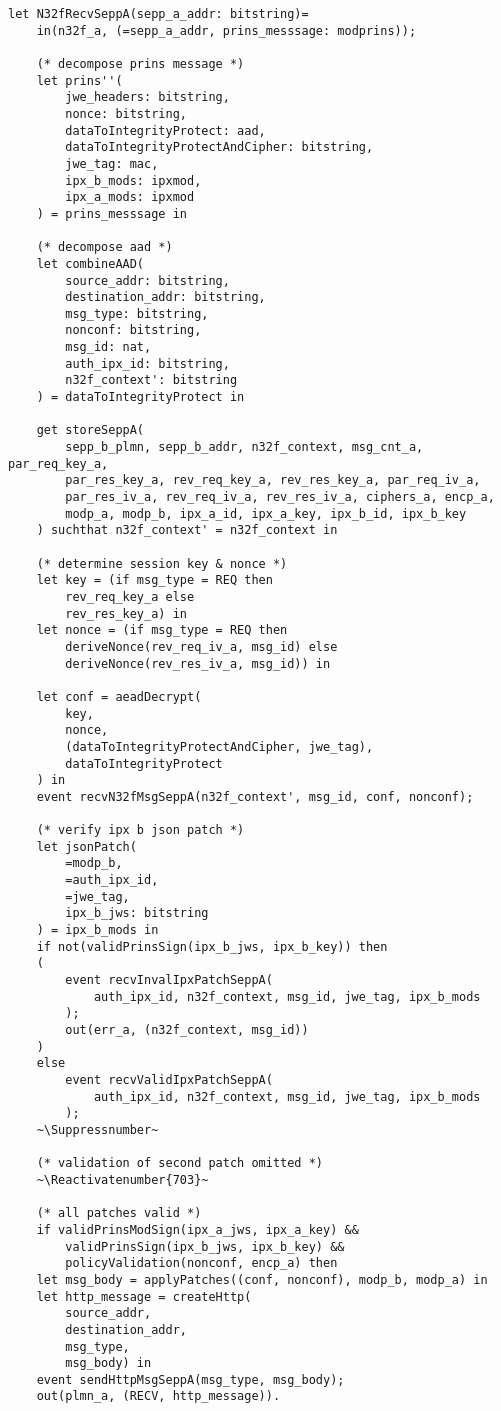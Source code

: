 \lstset{escapeinside=~~}
\begin{lstlisting}[caption={Definition of the receiving N32-f signaling transmission process},label={lst:n32f-recv},firstnumber=623]
let N32fRecvSeppA(sepp_a_addr: bitstring)=
    in(n32f_a, (=sepp_a_addr, prins_messsage: modprins));

    (* decompose prins message *)
    let prins''(
        jwe_headers: bitstring,
        nonce: bitstring,
        dataToIntegrityProtect: aad,
        dataToIntegrityProtectAndCipher: bitstring,
        jwe_tag: mac,
        ipx_b_mods: ipxmod,
        ipx_a_mods: ipxmod
    ) = prins_messsage in

    (* decompose aad *)
    let combineAAD(
        source_addr: bitstring,
        destination_addr: bitstring,
        msg_type: bitstring,
        nonconf: bitstring,
        msg_id: nat,
        auth_ipx_id: bitstring,
        n32f_context': bitstring
    ) = dataToIntegrityProtect in

    get storeSeppA(
        sepp_b_plmn, sepp_b_addr, n32f_context, msg_cnt_a, par_req_key_a,
        par_res_key_a, rev_req_key_a, rev_res_key_a, par_req_iv_a,
        par_res_iv_a, rev_req_iv_a, rev_res_iv_a, ciphers_a, encp_a,
        modp_a, modp_b, ipx_a_id, ipx_a_key, ipx_b_id, ipx_b_key
    ) suchthat n32f_context' = n32f_context in

    (* determine session key & nonce *)
    let key = (if msg_type = REQ then
        rev_req_key_a else
        rev_res_key_a) in
    let nonce = (if msg_type = REQ then
        deriveNonce(rev_req_iv_a, msg_id) else
        deriveNonce(rev_res_iv_a, msg_id)) in

    let conf = aeadDecrypt(
        key,
        nonce,
        (dataToIntegrityProtectAndCipher, jwe_tag),
        dataToIntegrityProtect
    ) in
    event recvN32fMsgSeppA(n32f_context', msg_id, conf, nonconf);

    (* verify ipx b json patch *)
    let jsonPatch(
        =modp_b,
        =auth_ipx_id,
        =jwe_tag,
        ipx_b_jws: bitstring
    ) = ipx_b_mods in
    if not(validPrinsSign(ipx_b_jws, ipx_b_key)) then
    (
        event recvInvalIpxPatchSeppA(
            auth_ipx_id, n32f_context, msg_id, jwe_tag, ipx_b_mods
        );
        out(err_a, (n32f_context, msg_id))
    )
    else
        event recvValidIpxPatchSeppA(
            auth_ipx_id, n32f_context, msg_id, jwe_tag, ipx_b_mods
        );
    ~\Suppressnumber~

    (* validation of second patch omitted *)
    ~\Reactivatenumber{703}~

    (* all patches valid *)
    if validPrinsModSign(ipx_a_jws, ipx_a_key) &&
        validPrinsSign(ipx_b_jws, ipx_b_key) &&
        policyValidation(nonconf, encp_a) then
    let msg_body = applyPatches((conf, nonconf), modp_b, modp_a) in
    let http_message = createHttp(
        source_addr,
        destination_addr,
        msg_type,
        msg_body) in
    event sendHttpMsgSeppA(msg_type, msg_body);
    out(plmn_a, (RECV, http_message)).
\end{lstlisting}

